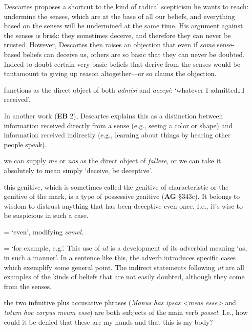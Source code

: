 \prenotes

Descartes proposes a shortcut to the kind of radical scepticism he wants to reach: undermine the senses, which are at the base of all our beliefs, and everything based on the senses will be undermined at the same time. His argument against the senses is brisk: they sometimes deceive, and therefore they can never be trusted. However, Descartes then raises an objection that even if \textit{some} sense-based beliefs can deceive us, others are so basic that they can never be doubted. Indeed to doubt certain very basic beliefs that derive from the senses would be tantamount to giving up reason altogether---or so claims the objection.

 functions as the direct object of both \textit{admisi} and \textit{accepi}: `whatever I admitted\dots I received'.

 In another work (\textbf{EB} 2), Descartes explains this as a distinction between information received directly from a sense (e.g., seeing a color or shape) and information received indirectly (e.g., learning about things by hearing other people speak).

 we can supply \textit{me} or \textit{nos} as the direct object of \textit{fallere}, or we can take it absolutely to mean simply `deceive, be deceptive'.

 this genitive, which is sometimes called the genitive of characteristic or the genitive of the mark, is a type of possessive genitive (\textbf{AG} §343c). It belongs to wisdom to distrust anything that has been deceptive even once. I.e., it's wise to be suspicious in such a case.

 = `even', modifying \textit{semel}.

 = `for example, e.g.'. This use of \textit{ut} is a development of its adverbial meaning `as, in such a manner'. In a sentence like this, the adverb introduces specific cases which exemplify some general point. The indirect statements following \textit{ut} are all examples of the kinds of beliefs that are not easily doubted, although they come from the senses.

 the two infinitive plus accusative phrases (\textit{Manus has ipsas <meas esse>} and \textit{totum hoc corpus meum esse}) are both subjects of the main verb \textit{posset}. I.e., how could it be denied that these are my hands and that this is my body?

